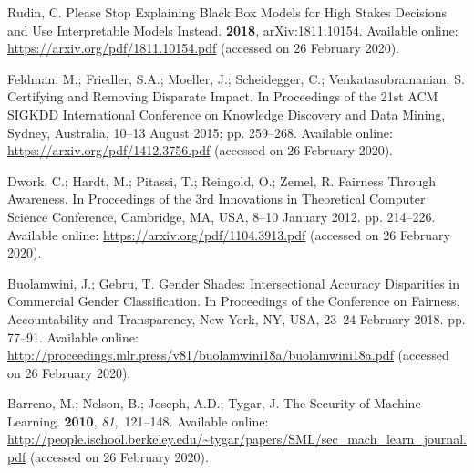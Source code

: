 \documentclass[information,article,accept,moreauthors,pdftex]{Definitions/mdpi}
\begin{document}
{%
\begin{thebibliography}{999}
\providecommand{\natexlab}[1]{#1}

Rudin, C.
\newblock Please {S}top {E}xplaining {B}lack {B}ox {M}odels for {H}igh {S}takes
  {D}ecisions and {U}se {I}nterpretable {M}odels {I}nstead.
 {\bf 2018}, arXiv:1811.10154.
\newblock  Available online: \url{https://arxiv.org/pdf/1811.10154.pdf} (accessed on 26 February 2020).

Feldman, M.; Friedler, S.A.; Moeller, J.; Scheidegger, C.; Venkatasubramanian,
  S.
\newblock Certifying and {R}emoving {D}isparate {I}mpact.
\newblock In {Proceedings of the 21{st} ACM SIGKDD International
  Conference on Knowledge Discovery and Data Mining},  Sydney, Australia, 10--13 August 2015; pp. 259--268.
\newblock Available online: \url{https://arxiv.org/pdf/1412.3756.pdf} (accessed on 26 February 2020).  



Dwork, C.; Hardt, M.; Pitassi, T.; Reingold, O.; Zemel, R.
\newblock Fairness {T}hrough {A}wareness.
\newblock  In {Proceedings of the 3rd Innovations in Theoretical Computer Science
  Conference}, Cambridge, MA, USA, 8--10 January 2012. pp. 214--226. 
\newblock Available online: \url{https://arxiv.org/pdf/1104.3913.pdf} (accessed on 26 February 2020).

Buolamwini, J.; Gebru, T.
\newblock Gender {S}hades: {I}ntersectional {A}ccuracy {D}isparities in
  {C}ommercial {G}ender {C}lassification.
\newblock In Proceedings of the  Conference on Fairness, Accountability and {Transparency}, New York, NY, USA, 23--24 February 2018. pp. 77--91.
\newblock Available online: 
  \url{http://proceedings.mlr.press/v81/buolamwini18a/buolamwini18a.pdf} (accessed on 26 February 2020).

Barreno, M.; Nelson, B.; Joseph, A.D.; Tygar, J.
\newblock The {S}ecurity of {M}achine {L}earning.
 {\bf 2010}, {\em 81},~121--148.
\newblock Available online: 
  \url{http://people.ischool.berkeley.edu/~tygar/papers/SML/sec_mach_learn_journal.pdf} (accessed on 26 February 2020).


\end{thebibliography}}
\end{document}
